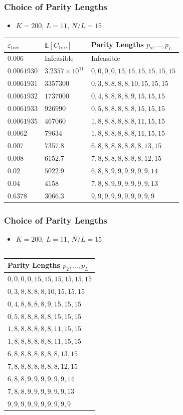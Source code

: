 \begin{frame}
\frametitle{Choice of Parity Lengths}
\begin{itemize}
\item $K=200$, $L=11$, $N/L=15$
\end{itemize}
\vfill
\begin{center}
\begin{tabular}{||l|l|l||}
\hline
 $\varepsilon_{\mathrm{tree}}$ & $\mathbb{E}[C_{\mathrm{tree}}]$ & Parity Lengths $p_2, \ldots, p_L$ \\[0.5ex]
\hline \hline
$0.006$ & Infeasible & Infeasible \tabularnewline
\hline
$0.0061930$ & $3.2357\times10^{11}$ & $ 0 ,0, 0, 0, 15, 15, 15, 15, 15, 15$ \tabularnewline
\hline
$0.0061931$ & $3357300$ & $ 0, 3, 8, 8, 8, 8, 10, 15, 15, 15$ \tabularnewline
\hline
$0.0061932$ & $1737000$ & $ 0, 4, 8, 8, 8, 8, 9, 15, 15, 15$ \tabularnewline
\hline
$0.0061933$ & $926990$ & $ 0, 5, 8, 8, 8, 8, 8, 15, 15, 15$ \tabularnewline
\hline
$0.0061935$ & $467060$ & $ 1, 8, 8, 8, 8, 8, 8, 11, 15, 15$ \tabularnewline
\hline
$0.0062$ & $79634$ & $ 1, 8, 8, 8, 8, 8, 8, 11, 15, 15$ \tabularnewline
\hline
$0.007$ & $7357.8$ & $ 6, 8, 8, 8, 8, 8, 8, 8, 13, 15$ \tabularnewline
\hline
$0.008$ & $6152.7$ & $ 7, 8, 8, 8, 8, 8, 8, 8, 12, 15$ \tabularnewline
\hline
$0.02$ & $5022.9$ & $ 6, 8, 8, 9, 9, 9, 9, 9, 9, 14$ \tabularnewline
\hline
$0.04$ & $4158$ & $ 7, 8, 8, 9, 9, 9, 9, 9, 9, 13$ \tabularnewline
\hline
$0.6378$ & $3066.3$ & $ 9, 9, 9, 9, 9, 9, 9, 9, 9, 9$ \tabularnewline
\hline
\end{tabular}
\end{center}
\end{frame}


\begin{frame}
\frametitle{Choice of Parity Lengths}
\begin{itemize}
\item $K=200$, $L=11$, $N/L=15$
\end{itemize}
\vfill
\begin{columns}
\centerline{}
\begin{tabular}{|l||}
\hline
Parity Lengths $p_2, \ldots, p_L$ \\[0.5ex]
\hline \hline
$ 0 ,0, 0, 0, 15, 15, 15, 15, 15, 15$ \tabularnewline
\hline
$ 0, 3, 8, 8, 8, 8, 10, 15, 15, 15$ \tabularnewline
\hline
$ 0, 4, 8, 8, 8, 8, 9, 15, 15, 15$ \tabularnewline
\hline
$ 0, 5, 8, 8, 8, 8, 8, 15, 15, 15$ \tabularnewline
\hline
$ 1, 8, 8, 8, 8, 8, 8, 11, 15, 15$ \tabularnewline
\hline
$ 1, 8, 8, 8, 8, 8, 8, 11, 15, 15$ \tabularnewline
\hline
$ 6, 8, 8, 8, 8, 8, 8, 8, 13, 15$ \tabularnewline
\hline
$ 7, 8, 8, 8, 8, 8, 8, 8, 12, 15$ \tabularnewline
\hline
$ 6, 8, 8, 9, 9, 9, 9, 9, 9, 14$ \tabularnewline
\hline
$ 7, 8, 8, 9, 9, 9, 9, 9, 9, 13$ \tabularnewline
\hline
$ 9, 9, 9, 9, 9, 9, 9, 9, 9, 9$ \tabularnewline
\hline
\end{tabular}
\end{columns}
\end{frame}

